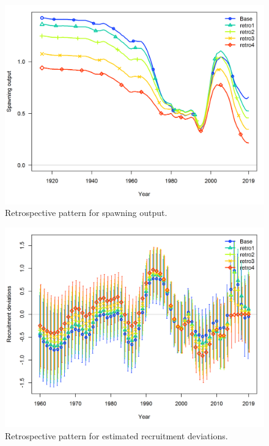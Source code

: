 \documentclass[12pt,]{article}
\begin{document}
\FloatBarrier

\begin{figure}
\centering
\includegraphics{Figures/retro_spawnb.png}
\caption{Retrospective pattern for spawning output.
\label{fig:retro_spawnb}}
\end{figure}

\FloatBarrier

\begin{figure}
\centering
\includegraphics{Figures/retro_recdev.png}
\caption{Retrospective pattern for estimated recruitment deviations.
\label{fig:retro_recdev}}
\end{figure}

\FloatBarrier
\end{document}
